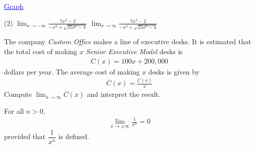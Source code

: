 \documentclass[../mathNotesPreamble]{subfiles}
\begin{document}
  \begin{center}
    \href{https://www.desmos.com/calculator/izlmkakqnp}{\textcolor{blue}{\underline{Graph}}}

  \end{center}
  \begin{extasks}[after-item-skip=\stretch{1}](2)
    \task $\displaystyle \lim_{x\to -\infty} \frac{7x^3-2}{-x^3+\sqrt{25x^6-4}}$
    \task $\displaystyle \lim_{x\to \infty} \frac{7x^3-2}{-x^3+\sqrt{25x^6-4}}$
  \end{extasks}
  \pagebreak

  \begin{ex*}
    The company \emph{Custom Office} makes a line of executive desks. It is estimated that the total cost of making $x$ \emph{Senior Executive Model} desks is
    \begin{align*}
      C(x)=100x+200,000
    \end{align*}
    dollars per year. The average cost of making $x$ desks is given by
    \begin{align*}
      \overline{C}(x)=\frac{C(x)}{x}
    \end{align*}
    Compute $\displaystyle \lim_{x\to \infty} \overline{C}(x)$ and interpret the result.
  \end{ex*}
  \begin{thmBox*}[Theorem 2]
    For all $n>0$,
    \begin{align*}
      \lim_{x\to \pm\infty} \frac{1}{x^n}=0
    \end{align*}
    provided that $\dfrac{1}{x^n}$ is defined.
  \end{thmBox*}

  \pagebreak
\end{document}
